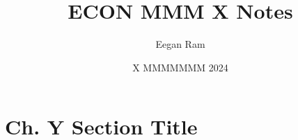 \documentclass{scrartcl}
\title{ECON MMM X Notes}
\author{Eegan Ram}
\date{X MMMMMMM 2024}
\begin{document}
\maketitle

\section{Ch. Y Section Title}
\end{document}
